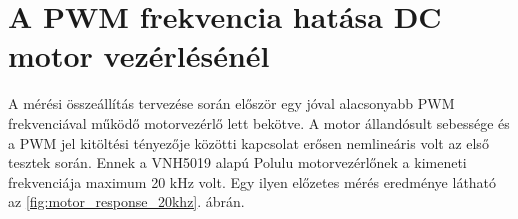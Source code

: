 

\chapter{A PWM frekvencia hatása DC motor vezérlésénél}\label{chap:effects_of_pwm_frequency}
A mérési összeállítás tervezése során először egy jóval alacsonyabb PWM frekvenciával működő 
motorvezérlő lett bekötve. A motor állandósult sebessége és a PWM jel kitöltési tényezője közötti kapcsolat 
erősen nemlineáris volt az első tesztek során. Ennek a VNH5019 alapú Polulu motorvezérlőnek a kimeneti frekvenciája 
maximum 20 kHz volt. Egy ilyen előzetes mérés eredménye látható az \ref{fig:motor_response_20khz}. ábrán. 

